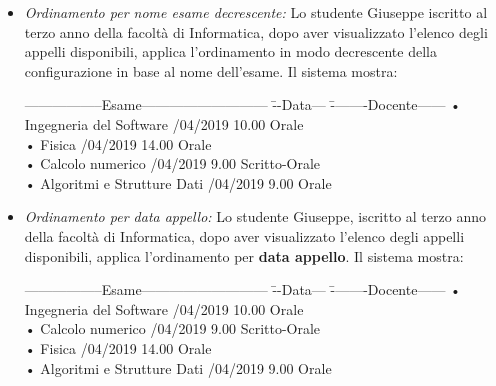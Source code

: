 \begin{itemize}
	\item \textit{Ordinamento per nome esame decrescente:}
	Lo studente Giuseppe iscritto al terzo anno della facoltà di Informatica, dopo aver visualizzato l'elenco degli appelli disponibili, applica l'ordinamento in modo decrescente della configurazione in base al nome dell’esame. Il sistema mostra:
	\begin{tabbing}
		\hspace{1cm}-----------------Esame--------------------------- \= --Data--- \= --------Docente------ \kill
		\hspace{1cm} • Ingegneria del Software /04/2019 10.00 \> \hspace{2cm} Orale \\
		\hspace{1cm} • Fisica /04/2019 14.00\> \hspace{2cm} Orale  \\
		\hspace{1cm} • Calcolo numerico /04/2019 9.00 \> \hspace{2cm} Scritto-Orale \\
		\hspace{1cm} • Algoritmi e Strutture Dati /04/2019 9.00\> \hspace{2cm} Orale \\
	\end{tabbing}
	
	\item \textit{Ordinamento per data appello:}
	Lo studente Giuseppe, iscritto al terzo anno della facoltà di Informatica, dopo aver visualizzato l’elenco degli appelli disponibili, applica l’ordinamento per \textbf{data appello}. Il sistema mostra:
	\begin{tabbing}
		\hspace{1cm}-----------------Esame--------------------------- \= --Data--- \= --------Docente------ \kill
		\hspace{1cm} • Ingegneria del Software /04/2019 10.00 \> \hspace{2cm} Orale \\
		\hspace{1cm} • Calcolo numerico /04/2019 9.00 \> \hspace{2cm} Scritto-Orale \\
		\hspace{1cm} • Fisica /04/2019 14.00\> \hspace{2cm} Orale  \\
		\hspace{1cm} • Algoritmi e Strutture Dati /04/2019 9.00\> \hspace{2cm} Orale \\
	\end{tabbing}
	

\end{itemize}
